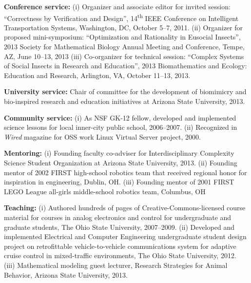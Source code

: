 \documentclass[svgnames,11pt]{article}
\begin{document}
\begin{bibenum}[itemsep=4pt]

    \item \textbf{Conference service:}
        (i) Organizer and associate editor for invited session:
        ``Correctness by Verification and Design'',
        14\textsuperscript{th} IEEE Conference on Intelligent
        Transportation Systems, Washington, DC, October
        5--7, 2011.
        (ii) Organizer for proposed mini-symposium: ``Optimization and
        Rationality in Eusocial Insects'', 2013 Society for Mathematical
        Biology Annual Meeting and Conference, Tempe, AZ,
        June 10--13, 2013
        (iii) Co-organizer for technical session: ``Complex Systems of
        Social Insects in Research and Education'', 2013 Biomathematics
        and Ecology: Education and Research, Arlington, VA,
        October 11--13, 2013.

    \item \textbf{University service:} Chair of committee for the
        development of biomimicry and bio-inspired research and education
        initiatives at Arizona State University, 2013.

    \item \textbf{Community service:}
        (i) As NSF GK-12 fellow, developed and implemented science
        lessons for local inner-city public school, 2006--2007.
        (ii) Recognized in \emph{Wired} magazine for OSS work Linux
        Virtual Server project, 2000.

    \item \textbf{Mentoring:}
        (i) Founding faculty co-adviser for Interdisciplinary Complexity
        Science Student Organization at Arizona State University, 2013.
        (ii) Founding mentor of 2002 FIRST high-school robotics team
        that received regional honor for inspiration in engineering,
        Dublin, OH.
        (iii) Founding mentor of 2001 FIRST LEGO League all-girls
        middle-school robotics team, Columbus, OH

    \item \textbf{Teaching:}
        (i) Authored hundreds of pages of Creative-Commons-licensed
        course material for courses in analog electronics and control
        for undergraduate and graduate students, The Ohio State
        University, 2007--2009.
        (ii) Developed and implemented Electrical and Computer
        Engineering undergraduate student design project on
        retrofittable vehicle-to-vehicle communications system for
        adaptive cruise control in mixed-traffic environments, The Ohio
        State University, 2012.
        (iii) Mathematical modeling guest lecturer, Research Strategies
        for Animal Behavior, Arizona State University, 2013.

\end{bibenum}
\end{document}
